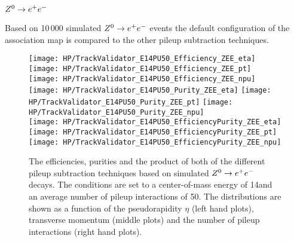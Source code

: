 \subsubsection{$\Zz\rightarrow\EE$}

Based on 10\,000 simulated  $\Zz\rightarrow\EE$ events the default configuration of the association map is compared to the other pileup subtraction techniques.

\begin{figure}[!h]
  \centering
  \texttt{[image: HP/TrackValidator\_E14PU50\_Efficiency\_ZEE\_eta]}
  \texttt{[image: HP/TrackValidator\_E14PU50\_Efficiency\_ZEE\_pt]}
  \texttt{[image: HP/TrackValidator\_E14PU50\_Efficiency\_ZEE\_npu]}
   \\
  \texttt{[image: HP/TrackValidator\_E14PU50\_Purity\_ZEE\_eta]}
  \texttt{[image: HP/TrackValidator\_E14PU50\_Purity\_ZEE\_pt]}
  \texttt{[image: HP/TrackValidator\_E14PU50\_Purity\_ZEE\_npu]}
   \\
  \texttt{[image: HP/TrackValidator\_E14PU50\_EfficiencyPurity\_ZEE\_eta]}
  \texttt{[image: HP/TrackValidator\_E14PU50\_EfficiencyPurity\_ZEE\_pt]}
  \texttt{[image: HP/TrackValidator\_E14PU50\_EfficiencyPurity\_ZEE\_npu]}
  \caption[Efficiencies, purities and their product of the different pileup subtraction techniques based $\Zz\rightarrow\EE$ decays with 14\TeV and $\left<PU\right>=50$]{The efficiencies, purities and the product of both of the different pileup subtraction techniques based on simulated $\Zz\rightarrow\EE$ decays. The conditions are set to a center-of-mass energy of 14\TeV and an average number of pileup interactions of 50. The distributions are shown as a function of the pseudorapidity $\eta$ (left hand plots), transverse momentum (middle plots) and the number of pileup interactions (right hand plots).}
\end{figure}
\clearpage

